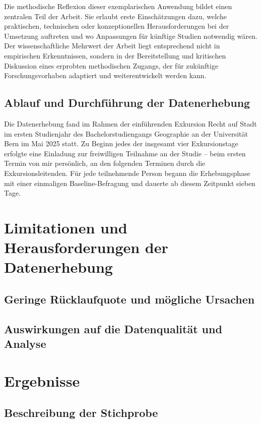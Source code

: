 Die methodische Reflexion dieser exemplarischen Anwendung bildet einen zentralen Teil der Arbeit. Sie erlaubt erste Einschätzungen dazu, welche praktischen, technischen oder konzeptionellen Herausforderungen bei der Umsetzung auftreten und wo Anpassungen für künftige Studien notwendig wären. Der wissenschaftliche Mehrwert der Arbeit liegt entsprechend nicht in empirischen Erkenntnissen, sondern in der Bereitstellung und kritischen Diskussion eines erprobten methodischen Zugangs, der für zukünftige Forschungsvorhaben adaptiert und weiterentwickelt werden kann.

\subsection{Ablauf und Durchführung der Datenerhebung}

Die Datenerhebung fand im Rahmen der einführenden Exkursion Recht auf Stadt im ersten Studienjahr des Bachelorstudiengangs Geographie an der Universität Bern im Mai 2025 statt. Zu Beginn jedes der insgesamt vier Exkursionstage erfolgte eine Einladung zur freiwilligen Teilnahme an der Studie -- beim ersten Termin von mir persönlich, an den folgenden Terminen durch die Exkursionsleitenden. Für jede teilnehmende Person begann die Erhebungsphase mit einer einmaligen Baseline-Befragung und dauerte ab diesem Zeitpunkt sieben Tage.


\section{Limitationen und Herausforderungen der Datenerhebung}

\subsection{Geringe Rücklaufquote und mögliche Ursachen}

\subsection{Auswirkungen auf die Datenqualität und Analyse}


\section{Ergebnisse} \label{sec:ergebnisse}

\subsection*{Beschreibung der Stichprobe}

